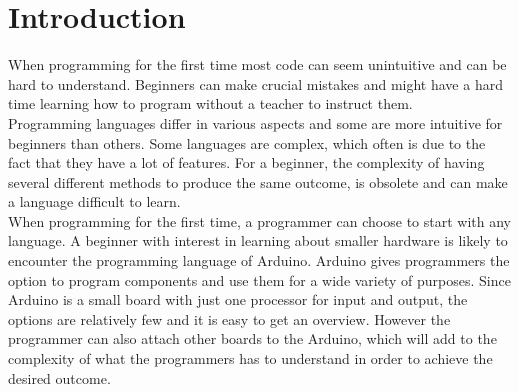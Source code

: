 \section{Introduction}
When programming for the first time most code can seem unintuitive and can be hard to understand. Beginners can make crucial mistakes and might have a hard time learning how to program without a teacher to instruct them.\\

Programming languages differ in various aspects and some are more intuitive for beginners than others. Some languages are complex, which often is due to the fact that they have a lot of features. For a beginner, the complexity of having several different methods to produce the same outcome, is obsolete and can make a language difficult to learn. \\

When programming for the first time, a programmer can choose to start with any language. A beginner with interest in learning about smaller hardware is likely to encounter the programming language of Arduino. Arduino gives programmers the option to program components and use them for a wide variety of purposes. Since Arduino is a small board with just one processor for input and output, the options are relatively few and it is easy to get an overview. However the programmer can also attach other boards to the Arduino, which will add to the complexity of what the programmers has to understand in order to achieve the desired outcome. \\